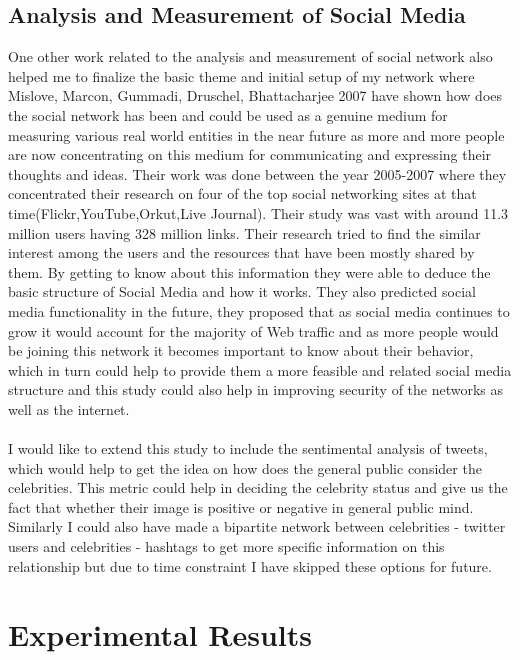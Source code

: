 \documentclass[runningheads,a4paper]{llncs}
\begin{document}
\subsection{Analysis and Measurement of Social Media}
One other work related to the analysis and measurement of social network \cite{2} also helped me to finalize the basic theme and initial setup of my network where Mislove, Marcon, Gummadi, Druschel, Bhattacharjee 2007 have shown how does the social network has been and could be used as a genuine medium for measuring various real world entities in the near future as more and more people are now concentrating on this medium for communicating and expressing their thoughts and ideas. Their work was done between the year 2005-2007 where they concentrated their research on four of the top social networking sites at that time(Flickr,YouTube,Orkut,Live Journal). Their study was vast with around 11.3 million users having 328 million links. Their research tried to find the similar interest among the users and the resources that have been mostly shared by them. By getting to know about this information they were able to deduce the basic structure of Social Media and how it works. They also predicted social media functionality in the future, they proposed that as social media continues to grow it would account for the majority of Web traffic and as more people would be joining this network it becomes important to know about their behavior, which in turn could help to provide them a more feasible and related social media structure and this study could also help in improving security of the networks as well as the internet.
\paragraph{}
I would like to extend this study to include the sentimental analysis of tweets, which would help to get the idea on how does the general public consider the celebrities. This metric could help in deciding the celebrity status and give us the fact that whether their image is positive or negative in general public mind. Similarly I could also have made a bipartite network between celebrities - twitter users and celebrities - hashtags to get more specific information on this relationship but due to time constraint I have skipped these options for future.

\section{Experimental Results}
\end{document}
